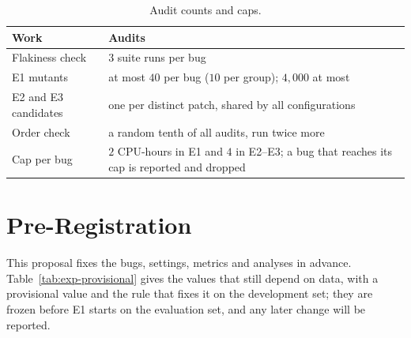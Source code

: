 \begin{table}[htbp]
\centering
\caption{Audit counts and caps.}
\label{tab:exp-compute}
\footnotesize
\begin{tabularx}{\textwidth}{@{}>{\raggedright\arraybackslash}p{} >{\raggedright\arraybackslash}X@{}}
\toprule
Work & Audits\\
\midrule
Flakiness check & $3$ suite runs per bug\\
E1 mutants & at most $40$ per bug ($10$ per group); $4{,}000$ at most\\
E2 and E3 candidates & one per distinct patch, shared by all configurations\\
Order check & a random tenth of all audits, run twice more\\
Cap per bug & $2$ CPU-hours in E1 and $4$ in E2--E3; a bug that reaches its cap is reported and dropped\\
\bottomrule
\end{tabularx}
\end{table}

\section{Pre-Registration}
\label{sec:exp-prereg}

This proposal fixes the bugs, settings, metrics and analyses in advance.
Table~\ref{tab:exp-provisional} gives the values that still depend on data,
with a provisional value and the rule that fixes it on the development set;
they are frozen before E1 starts on the evaluation set, and any later change
will be reported.

